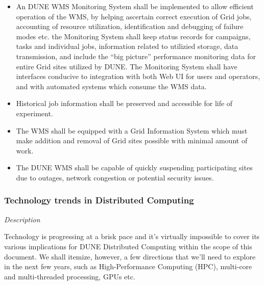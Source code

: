 \begin{itemize}
	\item An DUNE WMS Monitoring System shall be implemented to allow efficient operation of the WMS, by helping ascertain
	correct execution of Grid jobs, accounting of resource utilization, identification and debugging of failure modes etc.
	the Monitoring System shall keep status records for campaigns, tasks and individual jobs, information
	related to utilizied storage, data transmission, and include the ``big picture'' performance monitoring data for entire Grid sites utilized by DUNE.
	The Monitoring System shall have interfaces conducive to integration with both Web UI for users and operators,
	and with automated systems which consume the WMS data.

	\item Historical job information shall be preserved and accessible for life of experiment.

	\item The WMS shall be equipped with a Grid Information System which must make addition and removal of Grid sites possible with minimal amount of work.

	\item The DUNE WMS shall be capable of quickly suspending participating sites due to outages, network congestion or potential security issues.\end{itemize}

\subsubsection{Technology trends in Distributed Computing}
\textit{Description}

\noindent
Technology is progressing at a brisk pace and it's virtually impossible to cover its various implications for DUNE Distributed Computing within the scope of this document. We shall itemize, however, a few directions that we'll need to explore in the next few years, such as High-Performance Computing (HPC), multi-core and multi-threaded processing, GPUs etc.
\\ 

